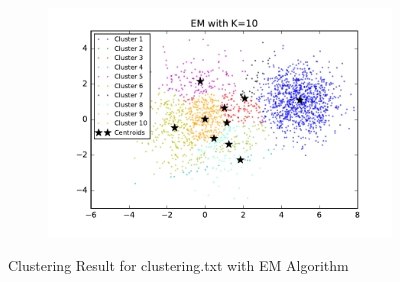\begin{figure}[htb]
\begin{subfigure}[b]{0.475\textwidth}
        \end{subfigure}
        \hfill
        \begin{subfigure}[b]{0.475\textwidth}   
            \centering 
            \includegraphics[width=\textwidth]{./figures/clustering_EM_10.pdf}
        \end{subfigure}
        
        \caption{Clustering Result for clustering.txt with EM Algorithm}
        \label{fig:kmean_clustering}
\end{figure}

